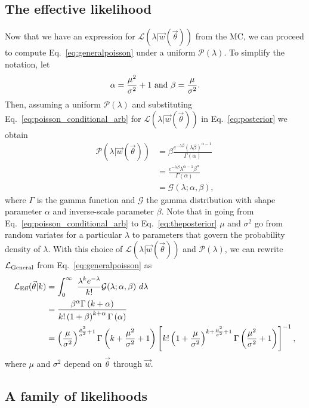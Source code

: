 \documentclass[a4paper, 11pt]{article}
\newcommand{\like}{\mathcal{L}}
\newcommand{\vectheta}{\vec{\theta}}
\newcommand{\vecw}{\vec{w}}
\newcommand{\prob}{\mathcal{P}}
\newcommand{\gprob}{\mathcal{G}}
\newcommand{\mcl}{\like_\textmd{Eff}}
\newcommand{\agpar}{\alpha}
\newcommand{\bgpar}{\beta}
\begin{document}
\subsection{The effective likelihood\label{sec:effective}}
Now that we have an expression for $\like(\lambda|\vecw(\vectheta))$ from the MC, we can proceed to compute Eq.~\eqref{eq:generalpoisson} under a uniform $\prob(\lambda)$. To simplify the notation, let
\begin{equation}\label{eq:alphabetamc}
\agpar = \frac{\mu^2}{\sigma^2}+1~\textmd{and}~\bgpar=\frac{\mu}{\sigma^2}.
\end{equation}
Then, assuming a uniform $\prob(\lambda)$ and substituting Eq.~\eqref{eq:poisson_conditional_arb} for $\like(\lambda|\vecw(\vectheta))$ in Eq.~\eqref{eq:posterior} we obtain
\begin{align} \label{eq:theposterior}
\prob(\lambda|\vecw(\vectheta)) &= \bgpar \frac{ e^{-\lambda \bgpar}(\lambda \bgpar )^{\agpar-1}}{\Gamma(\agpar)}\nonumber \\
&= \frac{e^{-\lambda \bgpar } \lambda^{\agpar-1} \bgpar^{\agpar}}{\Gamma(\agpar)} \nonumber \\
&= \gprob(\lambda;\agpar, \bgpar),
\end{align}
where $\Gamma$ is the gamma function and $\gprob$ the gamma distribution with shape parameter $\agpar$ and inverse-scale parameter $\bgpar$.
Note that in going from Eq.~\eqref{eq:poisson_conditional_arb} to Eq.~\eqref{eq:theposterior} $\mu$ and $\sigma^2$ go from random variates for a particular $\lambda$ to parameters that govern the probability density of $\lambda$. With this choice of $\like(\lambda|\vecw(\vectheta))$ and $\prob(\lambda)$, we can rewrite $\like_{\rm General}$ from Eq.~\eqref{eq:generalpoisson} as
\begin{align}
\mcl(\vectheta|k) &=\int_{0}^{\infty}~\frac{\lambda^k e^{-\lambda}}{k!}\gprob(\lambda;\agpar, \bgpar)~d\lambda \\
&= \frac{\bgpar^\agpar\Gamma\left(k+\agpar\right)}{k!\left(1+\bgpar\right)^{k+\agpar}\Gamma\left(\agpar\right)} \\
&= \left(\frac{\mu}{\sigma^2}\right)^{\frac{\mu^2}{\sigma^2}+1}\Gamma\left(k+\frac{\mu^2}{\sigma^2}+1\right)\left[k!\left(1+\frac{\mu}{\sigma^2}\right)^{k+\frac{\mu^2}{\sigma^2}+1}\Gamma\left(\frac{\mu^2}{\sigma^2}+1\right)\right]^{-1}, \label{eq:parametrizedpoisson}
\end{align}
where $\mu$ and $\sigma^2$ depend on $\vectheta$ through $\vecw$.

\subsection{A family of likelihoods\label{sec:priors}}
\end{document}
